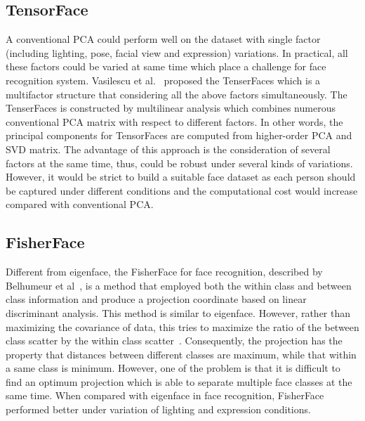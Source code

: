 \documentclass[12pt, a4paper, twoside]{article}
\begin{document}
\subsection{TensorFace}
A conventional PCA could perform well on the dataset with single factor (including lighting, pose, facial view and expression) variations. In practical, all these factors could be varied at same time which place a challenge for face recognition system. Vasilescu et al.~\cite{vasilescu2002multilinear} proposed the TenserFaces which is a multifactor structure that considering all the above factors simultaneously. The TenserFaces is constructed by multilinear analysis which combines numerous conventional PCA matrix with respect to different factors. In other words, the principal components for TensorFaces are computed from higher-order PCA and SVD matrix. The advantage of this approach is the consideration of several factors at the same time, thus, could be robust under several kinds of variations. However, it would be strict to build a suitable face dataset as each person should be captured under different conditions and the computational cost would increase compared with conventional PCA.

\subsection{FisherFace}
Different from eigenface, the FisherFace for face recognition, described by Belhumeur et al~\cite{598228}, is a method that employed both the within class and between class information and produce a projection coordinate based on linear discriminant analysis. This method is similar to eigenface. However, rather than maximizing the covariance of data, this tries to maximize the ratio of the between class scatter by the within class scatter~\cite{598228}. Consequently, the projection has the property that distances between different classes are maximum, while that within a same class is minimum. However, one of the problem is that it is difficult to find an optimum projection which is able to separate multiple face classes at the same time. When compared with eigenface in face recognition, FisherFace performed better under variation of lighting and expression conditions.
\end{document}
